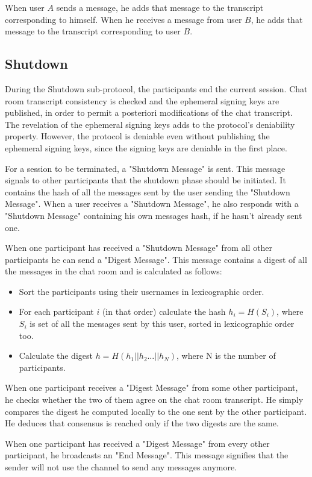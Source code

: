 When user $A$ sends a message, he adds that message to the transcript corresponding to himself.
When he receives a message from user $B$, he adds that message to the transcript corresponding to user $B$.

\subsection{Shutdown}
\label{subsections:shutdown}
During the Shutdown sub-protocol, the participants end the current session. Chat room transcript consistency is checked and the ephemeral signing keys are published, in order to permit a posteriori modifications of the chat transcript. The revelation of the ephemeral signing keys adds to the protocol's deniability property. However, the protocol is deniable even without publishing the ephemeral signing keys, since the signing keys are deniable in the first place.

For a session to be terminated, a "Shutdown Message" is sent. This message signals to other participants that the shutdown phase should be initiated. It contains the  hash of all the messages sent by the user sending the "Shutdown Message". When a user receives a "Shutdown Message", he also responds with a "Shutdown Message" containing his own messages hash, if he hasn't already sent one.

When one participant has received a "Shutdown Message" from all other participants he can send a "Digest Message". This message contains a digest of all the messages in the chat room and is calculated as follows:
\begin{itemize}
  \item[] Sort the participants using their usernames in lexicographic order.
  \item[] For each participant $i$ (in that order) calculate the hash $h_i = H(S_i)$, where $S_i$ is set of all the messages sent by this user, sorted in lexicographic order too.
  \item[] Calculate the digest $h = H(h_1 || h_2 \dots || h_N)$, where N is the number of participants.
\end{itemize}

When one participant receives a "Digest Message" from some other participant, he checks whether the two of them agree on the chat room transcript. He simply compares the digest he computed locally to the one sent by the other participant. He deduces that consensus is reached only if the two digests are the same.

When one participant has received a "Digest Message" from every other participant, he broadcasts an "End Message". This message signifies that the sender will not use the channel to send any messages anymore.

